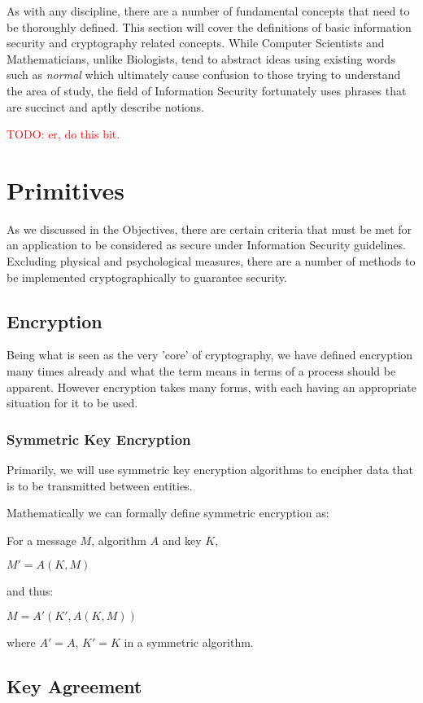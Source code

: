 As with any discipline, there are a number of fundamental concepts that need to be thoroughly defined. This section will cover the definitions of basic information security and cryptography related concepts. While Computer Scientists and Mathematicians, unlike Biologists, tend to abstract ideas using existing words such as \emph{normal} which ultimately cause confusion to those trying to understand the area of study, the field of Information Security fortunately uses phrases that are succinct and aptly describe notions.

\textcolor{red}{TODO: er, do this bit.}

\section{Primitives}

As we discussed in the Objectives, there are certain criteria that must be met for an application to be considered as secure under Information Security guidelines. Excluding physical and psychological measures, there are a number of methods to be implemented cryptographically to guarantee security.

\subsection{Encryption}

Being what is seen as the very 'core' of cryptography, we have defined encryption many times already and what the term means in terms of a process should be apparent. However encryption takes many forms, with each having an appropriate situation for it to be used.

\subsubsection{Symmetric Key Encryption}

Primarily, we will use symmetric key encryption algorithms to encipher data that is to be transmitted between entities.

Mathematically we can formally define symmetric encryption as:

For a message $M$, algorithm $A$ and key $K$,

$M'  = A(K,M)$

and thus:

$M = A'(K',A(K,M))$

where $A' = A$, $K' = K$ in a symmetric algorithm.

\subsection{Key Agreement}

